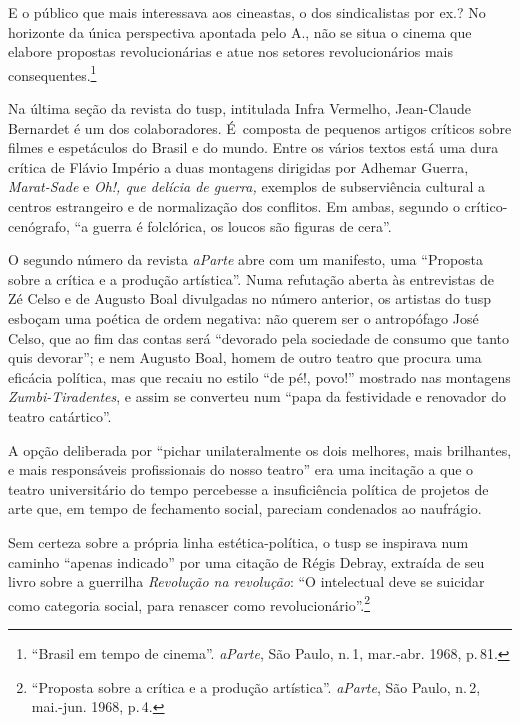 {\startblockquote
E o público que mais interessava aos cineastas, o dos sindicalistas por
ex.? No horizonte da única perspectiva apontada pelo A., não se situa o
cinema que elabore propostas revolucionárias e atue nos setores
revolucionários mais consequentes.\footnote{“Brasil em tempo de cinema”.
  {\it aParte}, São Paulo, n.\,1, mar.-abr. 1968, p.\,81.}
\stopblockquote

Na última seção da revista do {\sc tusp}, intitulada Infra Vermelho,
Jean-Claude Bernardet é um dos colaboradores. É~composta de pequenos
artigos críticos sobre filmes e espetáculos do Brasil e do mundo. Entre
os vários textos está uma dura crítica de Flávio Império a duas
montagens dirigidas por Adhemar Guerra, {\it Marat-Sade} e {\it Oh!, que
delícia de guerra,} exemplos de subserviência cultural a centros
estrangeiro e de normalização dos conflitos. Em ambas, segundo
o crítico-cenógrafo, “a guerra é folclórica, os loucos são figuras de
cera”.


O segundo número da revista {\it aParte} abre com um manifesto, uma
“Proposta sobre a crítica e a produção artística”. Numa refutação
aberta às entrevistas de Zé Celso e de Augusto Boal divulgadas no número
anterior, os artistas do {\sc tusp} esboçam uma poética de ordem negativa: não
querem ser o antropófago José Celso, que ao fim das contas será
“devorado pela sociedade de consumo que tanto quis devorar”; e nem
Augusto Boal, homem de outro teatro que procura uma eficácia política,
mas que recaiu no estilo “de pé!, povo!” mostrado nas montagens
{\it Zumbi-Tiradentes}, e assim se converteu num “papa da festividade e
renovador do teatro catártico”.

A opção deliberada por “pichar unilateralmente os dois melhores, mais
brilhantes, e mais responsáveis profissionais do nosso teatro” era uma
incitação a que o teatro universitário do tempo percebesse a
insuficiência política de projetos de arte que, em tempo de fechamento
social, pareciam condenados ao naufrágio.

Sem certeza sobre a própria linha estética-política, o {\sc tusp} se inspirava
num caminho “apenas indicado” por uma citação de Régis Debray, extraída
de seu livro sobre a guerrilha {\it Revolução na revolução}: “O
intelectual deve se suicidar como categoria social, para renascer como
revolucionário”.\footnote{“Proposta sobre a crítica e a produção
  artística”. {\it aParte}, São Paulo, n.\,2, mai.-jun. 1968, p.\,4.}

}
